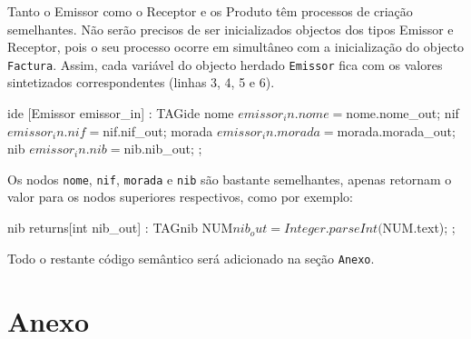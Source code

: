 \documentclass[11pt,a4paper]{article}
\begin{document}
Tanto o Emissor como o Receptor e os Produto têm processos de criação semelhantes. Não serão precisos de ser inicializados objectos dos tipos
 Emissor e Receptor, pois o seu processo ocorre em simultâneo com a inicialização do objecto \texttt{Factura}. Assim, cada variável do 
objecto herdado \texttt{Emissor} fica com os valores sintetizados correspondentes (linhas 3, 4, 5 e 6).

\begin{code_txt}
ide [Emissor emissor_in]
	:	TAGide	
		nome	{$emissor_in.nome = $nome.nome_out;}
		nif	{$emissor_in.nif = $nif.nif_out;}
		morada	{$emissor_in.morada = $morada.morada_out;}
		nib	{$emissor_in.nib = $nib.nib_out;}
	;
\end{code_txt}

Os nodos \texttt{nome}, \texttt{nif}, \texttt{morada} e \texttt{nib} são bastante semelhantes, apenas retornam o valor para os nodos superiores respectivos, como por exemplo:

\begin{code_txt}
 nib
returns[int nib_out]
	:	TAGnib	NUM{$nib_out = Integer.parseInt($NUM.text);}
	;
\end{code_txt}

Todo o restante código semântico será adicionado na seção \texttt{Anexo}.

\newpage
\section{Anexo}
\end{document}
